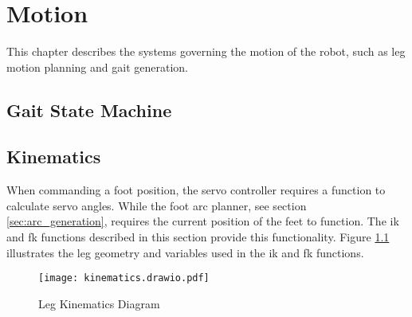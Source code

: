 \chapter{Motion}
This chapter describes the systems governing the motion of the robot, such as leg motion planning and gait generation.
\section{Gait State Machine}

\newpage
\section{Kinematics}
    When commanding a foot position, the servo controller requires a function to calculate servo angles. While the foot arc planner, see section 
    \ref{sec:arc_generation}, requires the current position of the feet to function. The \ac{ik} and \ac{fk} functions described in this section provide
    this functionality. Figure \ref{fig:kinematics} illustrates the leg geometry and variables used in the \ac{ik} and \ac{fk} functions.
    \begin{figure}[h]
        \centering
        \texttt{[image: kinematics.drawio.pdf]}
        \caption{Leg Kinematics Diagram}
        \label{fig:kinematics}
    \end{figure}

